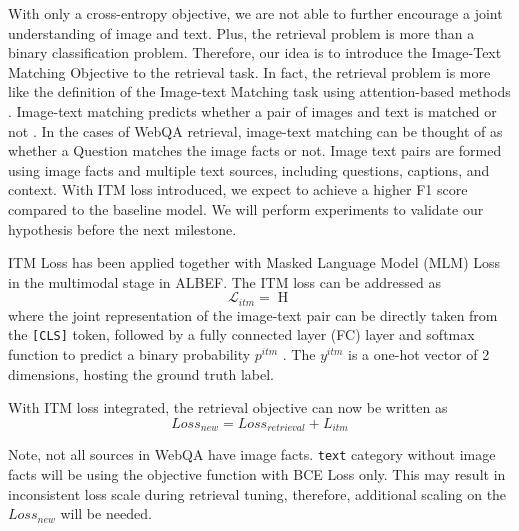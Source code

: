 \documentclass[nohyperref]{article}
\theoremstyle{plain}
\theoremstyle{definition}
\theoremstyle{remark}
\begin{document}
With only a cross-entropy objective, we are not able to further encourage a joint understanding of image and text. Plus, the retrieval problem is more than a binary classification problem. Therefore, our idea is to introduce the Image-Text Matching Objective to the retrieval task. In fact, the retrieval problem is more like the definition of the Image-text Matching task using attention-based methods \cite{ITM_cross_attn}. Image-text matching predicts whether a pair of images and text is matched or not \cite{albef}. In the cases of WebQA retrieval, image-text matching can be thought of as whether a Question matches the image facts or not. Image text pairs are formed using image facts and multiple text sources, including questions, captions, and context. With ITM loss introduced, we expect to achieve a higher F1 score compared to the baseline model. We will perform experiments to validate our hypothesis before the next milestone.

ITM Loss has been applied together with Masked Language Model (MLM) Loss in the multimodal stage in ALBEF\cite{albef}. The ITM loss can be addressed as
\begin{equation}
    \mathcal{L}_{itm}=\mathop{\mathbb{E}_{(I,T)\sim D}H(y^{itm}, p^{itm}(I,T))}
\end{equation}
where the joint representation of the image-text pair can be directly taken from the \texttt{[CLS]} token, followed by a fully connected layer (FC) layer and softmax function to predict a binary probability $p^{itm}$ \cite{albef}. The $y^{itm}$ is a one-hot vector of 2 dimensions, hosting the ground truth label. 

With ITM loss integrated, the retrieval objective can now be written as \begin{equation}
    Loss_{new}=Loss_{retrieval}+L_{itm}
\end{equation}

Note, not all sources in WebQA have image facts. \texttt{text} category without image facts will be using the objective function with BCE Loss only. This may result in inconsistent loss scale during retrieval tuning, therefore, additional scaling on the $Loss_{new}$ will be needed.
\end{document}
